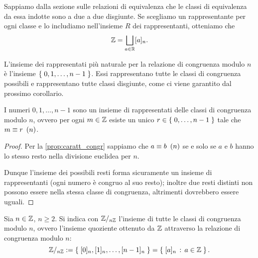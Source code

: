 Sappiamo dalla sezione sulle relazioni di equivalenza che le classi di equivalenza da essa indotte sono a due a due disgiunte. Se scegliamo un rappresentante per ogni classe e lo includiamo nell'insieme $R$ dei rappresentanti, otteniamo che \[
    \mathbb{Z} = \bigsqcup_{a \in \mathbb{R}} [a]_n. 
\]

L'insieme dei rappresentati più naturale per la relazione di congruenza modulo $n$ è l'insieme $\left\{\;0, 1, \dots, n-1\;\right\}$. Essi rappresentano tutte le classi di congruenza possibili e rappresentano tutte classi disgiunte, come ci viene garantito dal prossimo corollario.

\begin{corollary}
    I numeri $0, 1, \dots, n-1$ sono un insieme di rappresentati delle classi di congruenza modulo $n$, ovvero per ogni $m \in \mathbb{Z}$ esiste un unico $r \in \left\{\;0, \dots, n-1\;\right\}$ tale che $m \equiv r \ \left(n\right)$.
\end{corollary}
\begin{proof}
    Per la \autoref{prop:caratt_congr} sappiamo che $a \equiv b \ \left(n\right)$ se e solo se $a$ e $b$ hanno lo stesso resto nella divisione euclidea per $n$.

    Dunque l'insieme dei possibili resti forma sicuramente un insieme di rappresentanti (ogni numero è congruo al suo resto); inoltre due resti distinti non possono essere nella stessa classe di congruenza, altrimenti dovrebbero essere uguali.
\end{proof}

\begin{definition}
    Sia $n \in \mathbb{Z}$, $n \geq 2$. Si indica con $\mathbb{Z}/_{n\mathbb{Z}}$ l'insieme di tutte le classi di congruenza modulo $n$, ovvero l'insieme quoziente ottenuto da $\mathbb{Z}$ attraverso la relazione di congruenza modulo $n$: \begin{equation}
        \mathbb{Z}/_{n\mathbb{Z}} := \left\{\;[0]_n, [1]_n, \dots, [n-1]_n\;\right\} = \left\{\;[a]_n \,:\, a \in \mathbb{Z}\;\right\}.
    \end{equation}
\end{definition}